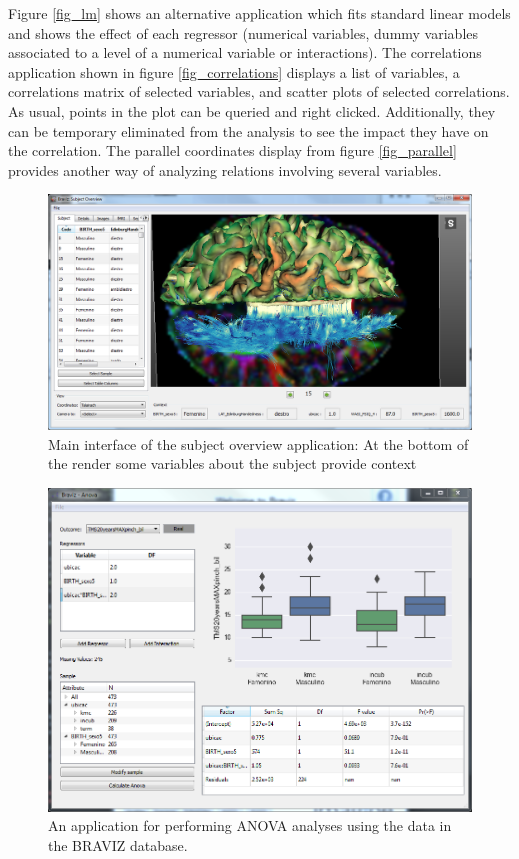 \documentclass[twocolumn]{svjour3}
\begin{document}
Figure \ref{fig_lm} shows an alternative application which fits standard linear models and shows the effect of each regressor (numerical variables, dummy variables associated to a level of a numerical variable or interactions). The correlations application shown in figure \ref{fig_correlations} displays a list of variables, a correlations matrix of selected variables, and scatter plots of selected correlations. As usual, points in the plot can be queried and right clicked. Additionally, they can be temporary eliminated from the analysis to see the impact they have on the correlation. The parallel coordinates display from figure \ref{fig_parallel} provides another way of analyzing relations involving several variables.

\begin{figure}
\begin{center}
\includegraphics[width=\linewidth]{figures/subj_overview_full.PNG}
\end{center}
 \caption{\label{fig_subject}Main interface of the subject overview application: At the bottom of the render some variables about the subject provide context}
\end{figure}

\begin{figure}
\begin{center}
\includegraphics[width=\linewidth]{figures/anova.PNG}
\end{center}
 \caption{\label{fig_anova}An application for performing ANOVA analyses using the data in the BRAVIZ database.}
\end{figure}
\end{document}
